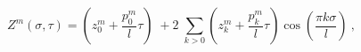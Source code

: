 \begin{equation}
     Z^m(\sigma, \tau) =
           \left(z^m_0 + \frac{p^m_0}{l } \tau \right) \; + 2 \;
           \sum_{k > 0} \left(z^{m}_k + \frac{p^{m}_k}{ l} \tau \right)
           \cos\left( \frac{\pi k \sigma}{l} \right) \ ,
\end{equation}

